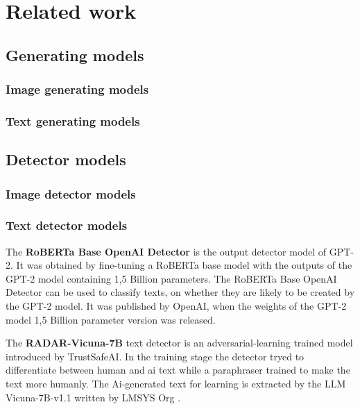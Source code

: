\documentclass{article} %
\begin{document}
\section{Related work}

\subsection{Generating models}

\subsubsection{Image generating models}

\subsubsection{Text generating models}

\subsection{Detector models}

\subsubsection{Image detector models}

\subsubsection{Text detector models}

The \textbf{RoBERTa Base OpenAI Detector} is the output detector model of GPT-2. It was obtained by fine-tuning a RoBERTa base model with the outputs of the GPT-2 model containing 1,5 Billion parameters. The RoBERTa Base OpenAI Detector can be used to classify texts, on whether they are likely to be created by the GPT-2 model. It was published by OpenAI, when the weights of the GPT-2 model 1,5 Billion parameter version was released.

The \textbf{RADAR-Vicuna-7B} text detector is an adversarial-learning trained model introduced by TrustSafeAI. In the training stage the detector tryed to differentiate between human and ai text while a paraphraser trained to make the text more humanly.
The Ai-generated text for learning is extracted by the LLM Vicuna-7B-v1.1 written by LMSYS Org \cite{hu2023radar}.
\end{document}
